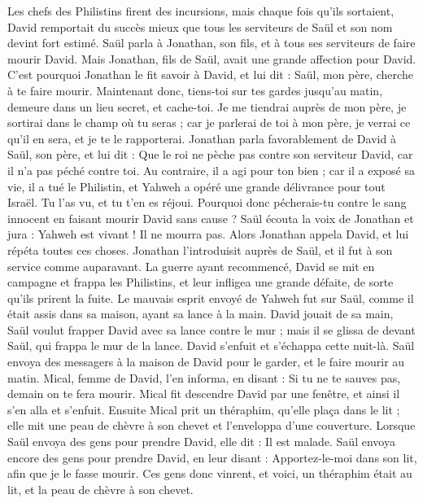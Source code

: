 \begin{multicols}{2}
Les chefs des Philistins firent des incursions, mais chaque fois qu'ils sortaient, David remportait du succès mieux que tous les serviteurs de Saül et son nom devint fort estimé.
\VerseOne{}Saül parla à Jonathan, son fils, et à tous ses serviteurs de faire mourir David.
Mais Jonathan, fils de Saül, avait une grande affection pour David. C'est pourquoi Jonathan le fit savoir à David, et lui dit : Saül, mon père, cherche à te faire mourir. Maintenant donc, tiens-toi sur tes gardes jusqu'au matin, demeure dans un lieu secret, et cache-toi.
Je me tiendrai auprès de mon père, je sortirai dans le champ où tu seras ; car je parlerai de toi à mon père, je verrai ce qu'il en sera, et je te le rapporterai.
Jonathan parla favorablement de David à Saül, son père, et lui dit : Que le roi ne pèche pas contre son serviteur David, car il n'a pas péché contre toi. Au contraire, il a agi pour ton bien ;
car il a exposé sa vie, il a tué le Philistin, et Yahweh a opéré une grande délivrance pour tout Israël. Tu l'as vu, et tu t'en es réjoui. Pourquoi donc pécherais-tu contre le sang innocent en faisant mourir David sans cause ?
Saül écouta la voix de Jonathan et jura : Yahweh est vivant ! Il ne mourra pas.
Alors Jonathan appela David, et lui répéta toutes ces choses. Jonathan l'introduisit auprès de Saül, et il fut à son service comme auparavant.
La guerre ayant recommencé, David se mit en campagne et frappa les Philistins, et leur infligea une grande défaite, de sorte qu'ils prirent la fuite.
Le mauvais esprit envoyé de Yahweh fut sur Saül, comme il était assis dans sa maison, ayant sa lance à la main. David jouait de sa main,
Saül voulut frapper David avec sa lance contre le mur ; mais il se glissa de devant Saül, qui frappa le mur de la lance. David s'enfuit et s'échappa cette nuit-là.
Saül envoya des messagers à la maison de David pour le garder, et le faire mourir au matin. Mical, femme de David, l'en informa, en disant : Si tu ne te sauves pas, demain on te fera mourir.
Mical fit descendre David par une fenêtre, et ainsi il s'en alla et s'enfuit.
Ensuite Mical prit un théraphim, qu'elle plaça dans le lit ; elle mit une peau de chèvre à son chevet et l'enveloppa d'une couverture.
Lorsque Saül envoya des gens pour prendre David, elle dit : Il est malade.
Saül envoya encore des gens pour prendre David, en leur disant : Apportez-le-moi dans son lit, afin que je le fasse mourir.
Ces gens donc vinrent, et voici, un théraphim était au lit, et la peau de chèvre à son chevet.

\end{multicols}
